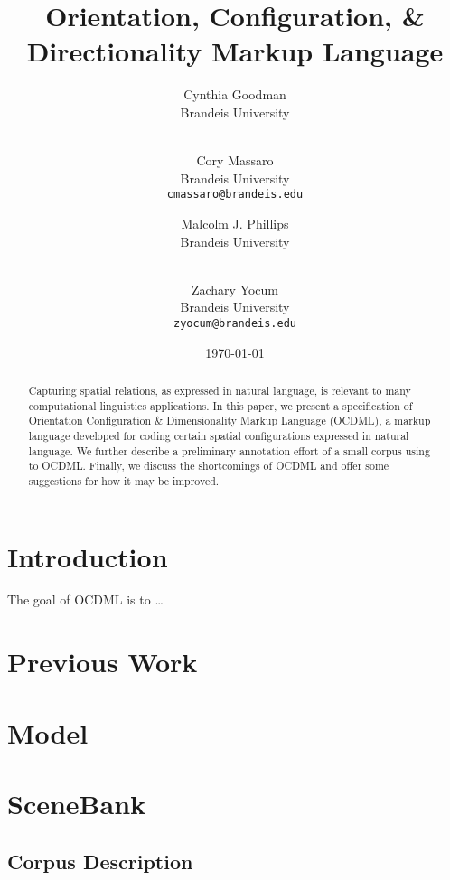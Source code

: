 \documentclass[11pt]{article}
\title{Orientation, Configuration, \& Directionality Markup Language}
\author{
    Cynthia Goodman \\
    Brandeis University \\
    \textt{cpg@brandeis.edu} \\
    \and
    Cory Massaro \\
    Brandeis University \\
    \texttt{cmassaro@brandeis.edu} \\
    \and
    Malcolm J. Phillips \\
    Brandeis University \\
    \textt{icos@brandeis.edu} \\
    \and
    Zachary Yocum \\
    Brandeis University \\
    \texttt{zyocum@brandeis.edu} 
}
\date{\today}
\begin{document}
\maketitle

\begin{abstract}
    Capturing spatial relations, as expressed in natural language, is relevant
    to many computational linguistics applications. In this paper, we present a
    specification of Orientation Configuration \& Dimensionality Markup
    Language (OCDML), a markup language developed for coding certain spatial
    configurations expressed in natural language. We further describe a
    preliminary annotation effort of a small corpus using to OCDML. Finally, we
    discuss the shortcomings of OCDML and offer some suggestions for how it may
    be improved.
\end{abstract}

\iffalse
Citations:
\cite{cohn1997qualitative}
\cite{isli2000new}
\cite{cristani2002spaceml}
\cite{slobin2001sign}
\cite{mani2010spatialml}
\cite{talmy1978figure}
\cite{herskovits1980spatial}
\fi

\section{Introduction} %
\label{sec:introduction}
The goal of OCDML is to \ldots

\section{Previous Work} %
\label{sec:previous_work}


\section{Model} %
\label{sec:model}


\section{SceneBank} %
\label{scenebank_data}

\subsection{Corpus Description} %
\label{sub:corpus_description}
\end{document}
